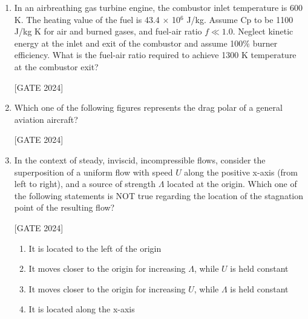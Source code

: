 \documentclass[journal,12pt,onecolumn]{IEEEtran}
\theoremstyle{remark}
\begin{document}
\begin{enumerate}
    \item In an airbreathing gas turbine engine, the combustor inlet temperature is 600 K. The heating value of the fuel is 43.4  $\times$ 10$^6$ J/kg. Assume Cp to be 1100 J/kg K for air and burned gases, and fuel-air ratio $f \ll 1.0$. Neglect kinetic energy at the inlet and exit of the combustor and assume 100\% burner efficiency. What is the fuel-air ratio required to achieve 1300 K temperature at the combustor exit?
   
        \hfill{[GATE 2024]}\begin{enumerate}    \end{enumerate}
    

    \item Which one of the following figures represents the drag polar of a general aviation aircraft?
   
        \hfill{[GATE 2024]}\begin{enumerate}   \end{enumerate}
    

    \item In the context of steady, inviscid, incompressible flows, consider the superposition of a uniform flow with speed $ U $ along the positive x-axis (from left to right), and a source of strength $ \Lambda $ located at the origin. Which one of the following statements is NOT true regarding the location of the stagnation point of the resulting flow?
    
        \hfill{[GATE 2024]}\begin{enumerate}
            \item It is located to the left of the origin
            \item It moves closer to the origin for increasing $ \Lambda $, while $ U $ is held constant
            \item It moves closer to the origin for increasing $ U $, while $ \Lambda $ is held constant
            \item It is located along the x-axis
        \end{enumerate}
    


\end{enumerate}
\end{document}
